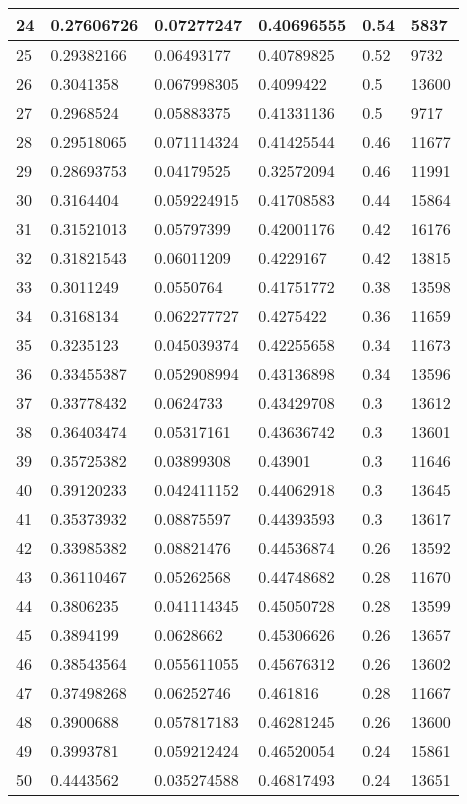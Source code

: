 \begin{longtable}{|l|l|l|l|l|l|}
24 & 0.27606726 & 0.07277247 & 0.40696555 & 0.54 & 5837 \\ \hline 
25 & 0.29382166 & 0.06493177 & 0.40789825 & 0.52 & 9732 \\ \hline 
26 & 0.3041358 & 0.067998305 & 0.4099422 & 0.5 & 13600 \\ \hline 
27 & 0.2968524 & 0.05883375 & 0.41331136 & 0.5 & 9717 \\ \hline 
28 & 0.29518065 & 0.071114324 & 0.41425544 & 0.46 & 11677 \\ \hline 
29 & 0.28693753 & 0.04179525 & 0.32572094 & 0.46 & 11991 \\ \hline 
30 & 0.3164404 & 0.059224915 & 0.41708583 & 0.44 & 15864 \\ \hline 
31 & 0.31521013 & 0.05797399 & 0.42001176 & 0.42 & 16176 \\ \hline 
32 & 0.31821543 & 0.06011209 & 0.4229167 & 0.42 & 13815 \\ \hline 
33 & 0.3011249 & 0.0550764 & 0.41751772 & 0.38 & 13598 \\ \hline 
34 & 0.3168134 & 0.062277727 & 0.4275422 & 0.36 & 11659 \\ \hline 
35 & 0.3235123 & 0.045039374 & 0.42255658 & 0.34 & 11673 \\ \hline 
36 & 0.33455387 & 0.052908994 & 0.43136898 & 0.34 & 13596 \\ \hline 
37 & 0.33778432 & 0.0624733 & 0.43429708 & 0.3 & 13612 \\ \hline 
38 & 0.36403474 & 0.05317161 & 0.43636742 & 0.3 & 13601 \\ \hline 
39 & 0.35725382 & 0.03899308 & 0.43901 & 0.3 & 11646 \\ \hline 
40 & 0.39120233 & 0.042411152 & 0.44062918 & 0.3 & 13645 \\ \hline 
41 & 0.35373932 & 0.08875597 & 0.44393593 & 0.3 & 13617 \\ \hline 
42 & 0.33985382 & 0.08821476 & 0.44536874 & 0.26 & 13592 \\ \hline 
43 & 0.36110467 & 0.05262568 & 0.44748682 & 0.28 & 11670 \\ \hline 
44 & 0.3806235 & 0.041114345 & 0.45050728 & 0.28 & 13599 \\ \hline 
45 & 0.3894199 & 0.0628662 & 0.45306626 & 0.26 & 13657 \\ \hline 
46 & 0.38543564 & 0.055611055 & 0.45676312 & 0.26 & 13602 \\ \hline 
47 & 0.37498268 & 0.06252746 & 0.461816 & 0.28 & 11667 \\ \hline 
48 & 0.3900688 & 0.057817183 & 0.46281245 & 0.26 & 13600 \\ \hline 
49 & 0.3993781 & 0.059212424 & 0.46520054 & 0.24 & 15861 \\ \hline 
50 & 0.4443562 & 0.035274588 & 0.46817493 & 0.24 & 13651 \\ \hline 
\end{longtable}
